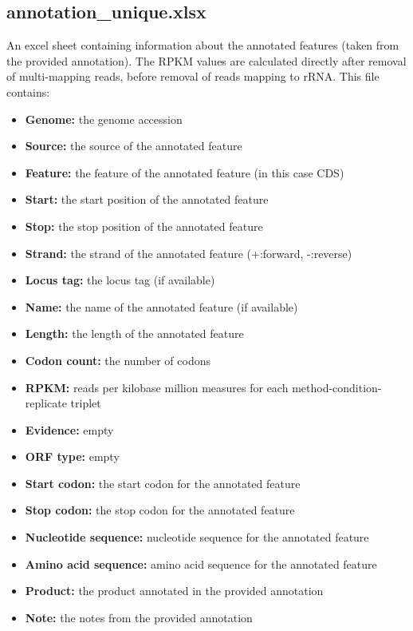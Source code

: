 \documentclass[10pt,a4paper]{article}
\begin{document}
\subsection*{annotation\_unique.xlsx}
An excel sheet containing information about the annotated features (taken from the provided annotation). The RPKM values are calculated directly after removal of multi-mapping reads, before removal of reads mapping to rRNA. This file contains: 
\begin{itemize}
\item \textbf{Genome:} the genome accession 
\item \textbf{Source:} the source of the annotated feature 
\item \textbf{Feature:} the feature of the annotated feature (in this case CDS)
\item \textbf{Start:} the start position of the annotated feature
\item \textbf{Stop:} the stop position of the annotated feature
\item \textbf{Strand:} the strand of the annotated feature (+:forward, -:reverse)
\item \textbf{Locus tag:} the locus tag (if available)
\item \textbf{Name:} the name of the annotated feature (if available)
\item \textbf{Length:} the length of the annotated feature
\item \textbf{Codon count:} the number of codons
\item \textbf{RPKM:} reads per kilobase million measures for each method-condition-replicate triplet
\item \textbf{Evidence:} empty
\item \textbf{ORF type:} empty
\item \textbf{Start codon:} the start codon for the annotated feature
\item \textbf{Stop codon:} the stop codon for the annotated feature
\item \textbf{Nucleotide sequence:} nucleotide sequence for the annotated feature
\item \textbf{Amino acid sequence:} amino acid sequence for the annotated feature
\item \textbf{Product:} the product annotated in the provided annotation
\item \textbf{Note:} the notes from the provided annotation
\end{itemize}
\end{document}
